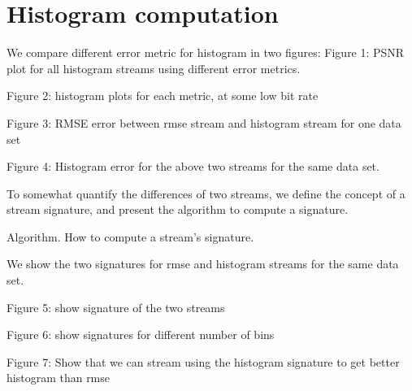 
\section{Histogram computation}
We compare different error metric for histogram in two figures:
Figure 1: PSNR plot for all histogram streams using different error metrics.

Figure 2: histogram plots for each metric, at some low bit rate

Figure 3: RMSE error between rmse stream and histogram stream for one data set

Figure 4: Histogram error for the  above two streams for the same data set.

To somewhat quantify the differences of two streams, we define the concept of a stream signature, and present the algorithm to compute a signature.

Algorithm. How to compute a stream's signature.

We show the two signatures for rmse and histogram streams for the same data set.

Figure 5: show signature of the two streams

Figure 6: show signatures for different number of bins

Figure 7: Show that we can stream using the histogram signature to get better histogram than rmse